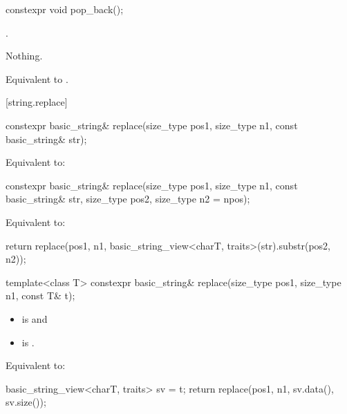 %
\begin{itemdecl}
constexpr void pop_back();
\end{itemdecl}

\begin{itemdescr}
\pnum
\expects
{}.

\pnum
\throws
Nothing.

\pnum
\effects
Equivalent to .
\end{itemdescr}

[string.replace]{}

%
\begin{itemdecl}
constexpr basic_string& replace(size_type pos1, size_type n1, const basic_string& str);
\end{itemdecl}

\begin{itemdescr}
\pnum
\effects
Equivalent to: 
\end{itemdescr}

%
\begin{itemdecl}
constexpr basic_string& replace(size_type pos1, size_type n1, const basic_string& str,
                                size_type pos2, size_type n2 = npos);
\end{itemdecl}

\begin{itemdescr}
\pnum
\effects
Equivalent to:
\begin{codeblock}
return replace(pos1, n1, basic_string_view<charT, traits>(str).substr(pos2, n2));
\end{codeblock}
\end{itemdescr}

%
\begin{itemdecl}
template<class T>
  constexpr basic_string& replace(size_type pos1, size_type n1, const T& t);
\end{itemdecl}

\begin{itemdescr}
\pnum
\constraints
\begin{itemize}
\item
{} is
 and
\item
{} is
.
\end{itemize}

\pnum
\effects
Equivalent to:
\begin{codeblock}
basic_string_view<charT, traits> sv = t;
return replace(pos1, n1, sv.data(), sv.size());
\end{codeblock}
\end{itemdescr}

